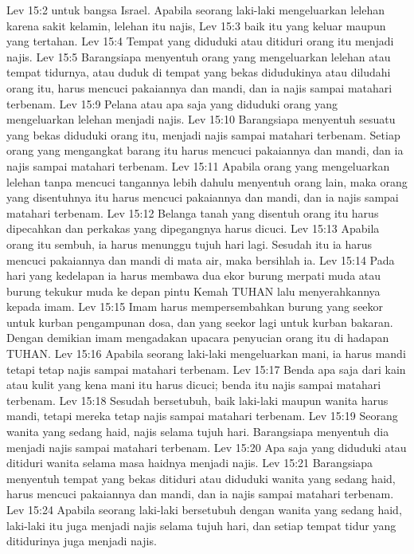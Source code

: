 Lev 15:2  untuk bangsa Israel. Apabila seorang laki-laki mengeluarkan lelehan karena sakit kelamin, lelehan itu najis,
Lev 15:3  baik itu yang keluar maupun yang tertahan.
Lev 15:4  Tempat yang diduduki atau ditiduri orang itu menjadi najis.
Lev 15:5  Barangsiapa menyentuh orang yang mengeluarkan lelehan atau tempat tidurnya, atau duduk di tempat yang bekas didudukinya atau diludahi orang itu, harus mencuci pakaiannya dan mandi, dan ia najis sampai matahari terbenam.
Lev 15:9  Pelana atau apa saja yang diduduki orang yang mengeluarkan lelehan menjadi najis.
Lev 15:10  Barangsiapa menyentuh sesuatu yang bekas diduduki orang itu, menjadi najis sampai matahari terbenam. Setiap orang yang mengangkat barang itu harus mencuci pakaiannya dan mandi, dan ia najis sampai matahari terbenam.
Lev 15:11  Apabila orang yang mengeluarkan lelehan tanpa mencuci tangannya lebih dahulu menyentuh orang lain, maka orang yang disentuhnya itu harus mencuci pakaiannya dan mandi, dan ia najis sampai matahari terbenam.
Lev 15:12  Belanga tanah yang disentuh orang itu harus dipecahkan dan perkakas yang dipegangnya harus dicuci.
Lev 15:13  Apabila orang itu sembuh, ia harus menunggu tujuh hari lagi. Sesudah itu ia harus mencuci pakaiannya dan mandi di mata air, maka bersihlah ia.
Lev 15:14  Pada hari yang kedelapan ia harus membawa dua ekor burung merpati muda atau burung tekukur muda ke depan pintu Kemah TUHAN lalu menyerahkannya kepada imam.
Lev 15:15  Imam harus mempersembahkan burung yang seekor untuk kurban pengampunan dosa, dan yang seekor lagi untuk kurban bakaran. Dengan demikian imam mengadakan upacara penyucian orang itu di hadapan TUHAN.
Lev 15:16  Apabila seorang laki-laki mengeluarkan mani, ia harus mandi tetapi tetap najis sampai matahari terbenam.
Lev 15:17  Benda apa saja dari kain atau kulit yang kena mani itu harus dicuci; benda itu najis sampai matahari terbenam.
Lev 15:18  Sesudah bersetubuh, baik laki-laki maupun wanita harus mandi, tetapi mereka tetap najis sampai matahari terbenam.
Lev 15:19  Seorang wanita yang sedang haid, najis selama tujuh hari. Barangsiapa menyentuh dia menjadi najis sampai matahari terbenam.
Lev 15:20  Apa saja yang diduduki atau ditiduri wanita selama masa haidnya menjadi najis.
Lev 15:21  Barangsiapa menyentuh tempat yang bekas ditiduri atau diduduki wanita yang sedang haid, harus mencuci pakaiannya dan mandi, dan ia najis sampai matahari terbenam.
Lev 15:24  Apabila seorang laki-laki bersetubuh dengan wanita yang sedang haid, laki-laki itu juga menjadi najis selama tujuh hari, dan setiap tempat tidur yang ditidurinya juga menjadi najis.
